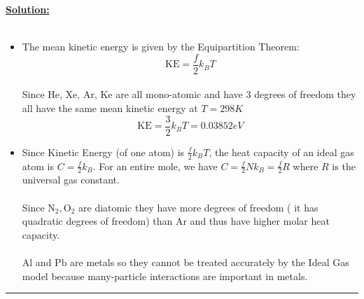 \documentclass[11pt]{article}
\begin{document}
\vskip 0.5cm
\textbf{\underline{Solution:}}
\\
\\
\begin{itemize}
  \item The mean kinetic energy is given by the Equipartition Theorem: $$ \mathrm{KE} = \frac{f}{2} k_B T $$\\
  Since He, Xe, Ar, Ke are all mono-atomic and have $3$ degrees of freedom they all have the same mean kinetic energy at $T = 298 K$
  $$ \mathrm{KE} = \frac{3}{2} k_B T = 0.03852 eV $$
  
  \item Since Kinetic Energy (of one atom) is $\frac{f}{2} k_B T$, the heat capacity of an ideal gas atom is $C = \frac{f}{2} k_B$. For an entire mole, we have $C = \frac{f}{2} N k_B = \frac{f}{2} R$ where $R$ is the universal gas constant. 
  \\
  \\
  Since $\mathrm{N}_2, \mathrm{O}_2$ are diatomic they have more degrees of freedom ( it has quadratic degrees of freedom) than $\mathrm{Ar}$ and thus have higher molar heat capacity.
  \\
  \\
  $\mathrm{Al}$ and $\mathrm{Pb}$ are metals so they cannot be treated accurately by the Ideal Gas model because many-particle interactions are important in metals.
\end{itemize}
\vskip 0.5cm
\hrule
\pagebreak










% 
\end{document}
